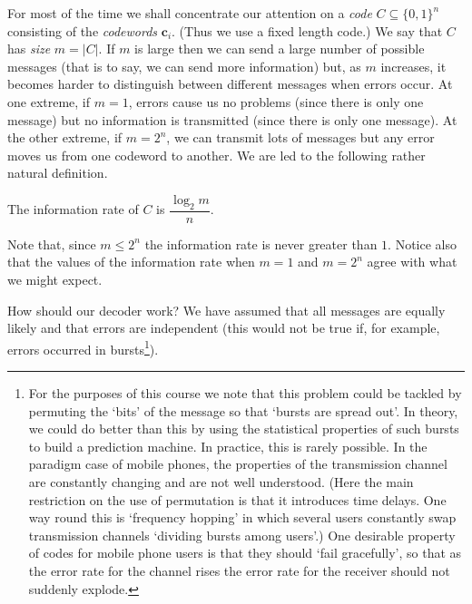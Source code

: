 For most of the time we shall concentrate our attention
on a \emph{code} $C\subseteq\{0,1\}^{n}$ consisting
of the \emph{codewords} $\mathbf{c}_{i}$.
(Thus we use a fixed length code.) We say that
$C$ has \emph{size} $m=|C|$. 
If $m$ is large then
we can send a large number of possible messages
(that is to say, we can send more information) but,
as $m$ increases, it becomes harder to distinguish
between different messages when errors occur.
At one extreme, if $m=1$, errors cause us no problems
(since there is only one message) but no information
is transmitted (since there is only one message).
At the other extreme, if $m=2^{n}$, we can transmit
lots of messages but any error moves us from one
codeword to another. We are led to the following
rather natural definition.
\begin{definition}\label{information rate}
The information rate of $C$ is
$\dfrac{\log_{2} m}{n}$.
\end{definition}
Note that, since $m\leq 2^{n}$ the information rate
is never greater than $1$. Notice also that the values of
the information rate when $m=1$ and $m=2^{n}$ agree
with what we might expect.
 
How should our decoder work? We have assumed that
all messages are equally likely and that errors
are independent (this would not be true if, for
example, errors occurred in bursts\footnote{For
the purposes of this course we note
that this problem could
be tackled by permuting the `bits' of the message
so that `bursts are spread out'. In theory, we
could do better than this by using
the statistical properties of such bursts
to build a prediction machine.
In practice, this is rarely possible.
In the paradigm case of mobile phones,
the properties of the transmission channel
are constantly changing and are not well understood.
(Here the main restriction on the use of permutation
is that it introduces time delays. One way round this
is `frequency hopping' in which several users
constantly swap transmission channels `dividing
bursts among users'.) One desirable property of
codes for mobile phone users is that they should
`fail gracefully', so that as the error rate
for the channel rises the error rate for the receiver
should not suddenly explode.}).

